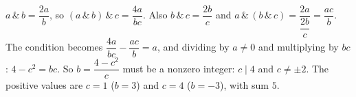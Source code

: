 $a\,\&\,b=\dfrac{2a}b$, so $(a\,\&\,b)\,\&\,c=\dfrac{4a}{bc}$. Also $b\,\&\,c=\dfrac{2b}c$ and $a\,\&\,(b\,\&\,c)=\dfrac{2a}{\dfrac{2b}c}=\dfrac{ac}b$. The condition becomes $\dfrac{4a}{bc}-\dfrac{ac}{b}=a$, and dividing by $a\ne0$ and multiplying by $bc$: $4-c^2=bc$. So $b=\dfrac{4-c^2}{c}$ must be a nonzero integer: $c\mid4$ and $c\ne\pm2$. The positive values are $c=1$ ($b=3$) and $c=4$ ($b=-3$), with sum $\boxed{5}$.
